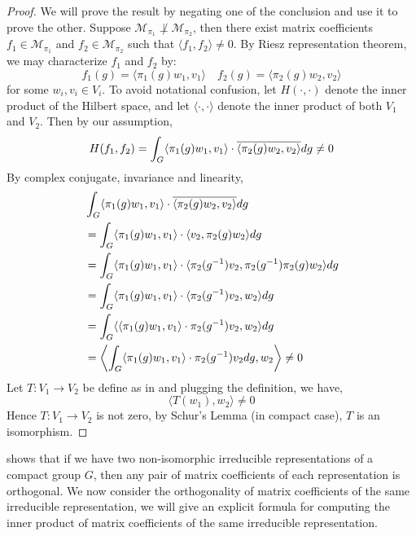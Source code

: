 \begin{proof}
  We will prove the result by negating one of the conclusion and use it to prove
  the other.  Suppose $\mathcal{M}_{\pi_1} \not\perp \mathcal{M}_{\pi_2}$, then
  there exist matrix coefficients $f_1 \in \mathcal{M}_{\pi_1}$ and $f_2 \in
  \mathcal{M}_{\pi_2}$ such that $\langle f_1 , f_2 \rangle \neq 0$.  By Riesz
  representation theorem, we may characterize $f_1$ and $f_2$ by:
  \[
    f_1(g) = \langle \pi_1(g)w_1 , v_1 \rangle
    \quad
    f_2(g) = \langle \pi_2(g)w_2 , v_2 \rangle
  \]
  for some $w_i, v_i \in V_i$.  To avoid notational confusion, let
  $H(\cdot,\cdot)$ denote the inner product of the Hilbert space, and let
  $\langle \cdot, \cdot \rangle$ denote the inner product of both $V_1$ and
  $V_2$. Then by our assumption,
  \[
    H(f_1, f_2) = \int_G \langle \pi_1(g)w_1, v_1 \rangle \cdot
    \overline{\langle \pi_2(g)w_2, v_2 \rangle} dg \neq 0
  \]
  By complex conjugate, invariance and linearity,
  \begin{align*}
    & \int_G \langle \pi_1(g)w_1, v_1 \rangle \cdot \overline{\langle \pi_2(g)w_2, v_2 \rangle} dg\\
    & = \int_G \langle \pi_1(g)w_1, v_1 \rangle \cdot \langle v_2, \pi_2(g)w_2 \rangle dg\\
    & = \int_G \langle \pi_1(g)w_1, v_1 \rangle \cdot \langle \pi_2(g^{-1}) v_2, \pi_2(g^{-1}) \pi_2(g)w_2 \rangle dg\\
    & = \int_G \langle \pi_1(g)w_1, v_1 \rangle \cdot \langle \pi_2(g^{-1}) v_2, w_2 \rangle dg\\
    & = \int_G \langle \langle \pi_1(g)w_1, v_1 \rangle \cdot \pi_2(g^{-1}) v_2, w_2 \rangle dg\\
    & = \left\langle \int_G \langle \pi_1(g)w_1, v_1 \rangle \cdot \pi_2(g^{-1}) v_2 dg, w_2 \right\rangle \neq 0
  \end{align*}
  Let $T : V_1 \to V_2$ be define as in  and plugging
  the definition, we have,
  \[
    \langle T(w_1),w_2 \rangle \neq 0
  \]
  Hence $T : V_1 \to V_2$ is not zero, by Schur's Lemma (in compact case), $T$
  is an isomorphism.
\end{proof}

 shows that if we have two non-isomorphic irreducible
representations of a compact group $G$, then any pair of matrix coefficients of
each representation is orthogonal.  We now consider the orthogonality of matrix
coefficients of the same irreducible representation, we will give an explicit
formula for computing the inner product of matrix coefficients of the same
irreducible representation.

